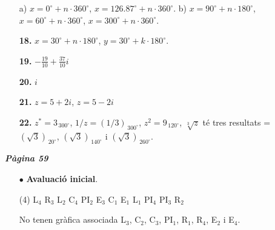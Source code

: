 \documentclass[a4paper, pdf, twoside]{book}
\begin{document}
\begin{multicols}{2}
\begin{enumerate}
a) $x= 0^\circ + n\cdot 360^\circ $, $x=126.87^\circ + n\cdot 360^\circ $. b) $x= 90^\circ + n\cdot 180^\circ $, $x= 60^\circ + n\cdot 360^\circ $, $x= 300^\circ + n\cdot 360^\circ $.
\vspace{0.25cm}
\item[\fontfamily{phv}\selectfont\color{blue}\textbf{18. }]  \scalebox{0.6}{\simbolclau } 
$x=30^\circ + n\cdot 180^\circ $, $y=30^\circ + k\cdot 180^\circ $.
\vspace{0.25cm}
\item[\fontfamily{phv}\selectfont\color{blue}\textbf{19. }]  \scalebox{0.6}{\simbolclau } 
$-\frac {19}{10}+\frac {37}{10}i$
\vspace{0.25cm}
\item[\fontfamily{phv}\selectfont\color{blue}\textbf{20. }]  \scalebox{0.6}{\simbolclau } 
$i$
\vspace{0.25cm}
\item[\fontfamily{phv}\selectfont\color{blue}\textbf{21. }]  \scalebox{0.6}{\simbolclau } 
$z=5+2i$, $z=5-2i$
\vspace{0.25cm}
\item[\fontfamily{phv}\selectfont\color{blue}\textbf{22. }]  \scalebox{0.6}{\simbolclau } 
 $z^*=3_{\, 300^\circ }$, $1/z=(1/3)_{\, 300^\circ }$, $z^2=9_{\, 120^\circ }$, $\sqrt [3]{z}$ té tres resultats = $(\sqrt {3})_{\, 20^\circ }$, $(\sqrt {3})_{\, 140^\circ }$ i $(\sqrt {3})_{\, 260^\circ }$.
 \end{enumerate}
\vfill\null
\columnbreak
\def\currentname{Solucions del Tema 5}
\vspace*{0.75cm}

 

\vspace*{0.4cm}
 {}
\vspace{0.3cm}


{\textbf{\em Pàgina 59}} \hrulefill
\begin{enumerate}
\vspace{0.25cm}
 \item[$\bullet$ ] {\selectfont\color{blue}\textbf{Avaluació inicial}. }
 \begin{tasks}(4) \task L$_{4}$ \task R$_3$ \task L$_2$ \task C$_4$ \task PI$_{2}$ \task E$_3$ \task C$_1$ \task E$_1$ \task L$_{1}$ \task PI$_4$ \task PI$_3$ \task R$_2$ \end{tasks} \par No tenen gràfica associada L$_3$, C$_2$, C$_3$, PI$_1$, R$_1$, R$_4$, E$_2$ i E$_4$. 
 \end{enumerate}
\vspace{0.3cm}


\end{multicols}
\end{document}
